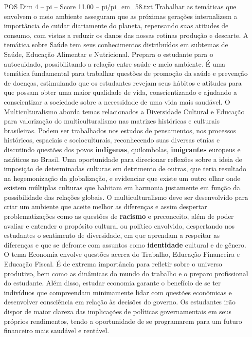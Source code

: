 \begin{textsample}{POS Dim 4 – pi – Score 11.00 – pi/pi\_em\_58.txt}
Trabalhar as temáticas que envolvem o meio ambiente asseguram que as próximas gerações internalizem a importância de cuidar diariamente do planeta, repensando suas atitudes de consumo, com vistas a reduzir os danos das nossas rotinas produção e descarte.
A temática sobre Saúde tem seus conhecimentos distribuídos em subtemas de Saúde, Educação Alimentar e Nutricional.
Prepara o estudante para o autocuidado, possibilitando a relação entre saúde e meio ambiente.
É uma temática fundamental para trabalhar questões de promoção da saúde e prevenção de doenças, estimulando que os estudantes revejam seus hábitos e atitudes para que possam obter uma maior qualidade de vida, conscientizando e ajudando a conscientizar a sociedade sobre a necessidade de uma vida mais saudável.
O Multiculturalismo aborda temas relacionados a Diversidade Cultural e Educação para valorização do multiculturalismo nas matrizes históricas e culturais brasileiras.
Podem ser trabalhados nos estudos de pensamentos, nos processos históricos, espaciais e socioculturais, reconhecendo suas diversas etnias e discutindo questões dos povos \textbf{indígenas}, quilombolas, \textbf{imigrantes} europeus e asiáticos no Brasil.
Uma oportunidade para direcionar reflexões sobre a ideia de imposição de determinadas culturas em detrimento de outras, que teria resultado na hegemonização da globalização, e evidenciar que existe um outro olhar onde existem múltiplas culturas que habitam em harmonia justamente em função da possibilidade das relações globais.
O multiculturalismo deve ser desenvolvido para criar um ambiente que aceite melhor as diferenças e assim despertar problematizações como as questões de \textbf{racismo} e preconceito, além de poder avaliar e entender o propósito cultural ou político envolvido, despertando nos estudantes o sentimento de diversidade, em que aprendam a respeitar as diferenças e que se defronte com assuntos como \textbf{identidade} cultural e de gênero.
O tema Economia envolve questões acerca do Trabalho, Educação Financeira e Educação Fiscal.
É de extrema importância para refletir sobre o universo produtivo, bem como as dinâmicas do mundo do trabalho e o preparo profissional do estudante.
Além disso, estudar economia garante o benefício de se ter indivíduos que compreendam minimamente lidar com questões econômicas e desenvolver consciência em relação às decisões do governo.
Os estudantes irão dispor de maior clareza das implicações de políticas governamentais em seus próprios rendimentos, tendo a oportunidade de se programarem para um futuro financeiro mais saudável e rentável.

\end{textsample}
